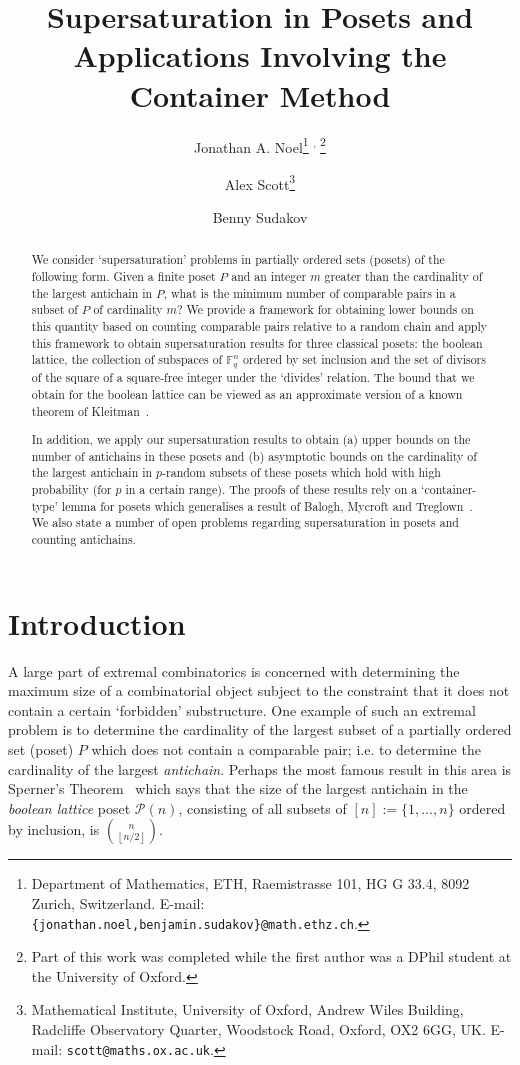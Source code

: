 \documentclass[11 pt]{article}
\title{Supersaturation in Posets and Applications Involving the Container Method}
\author{Jonathan A. Noel\thanks{Department of Mathematics, ETH, Raemistrasse 101, HG G 33.4, 8092 Zurich, Switzerland. E-mail: \texttt{\{jonathan.noel,benjamin.sudakov\}@math.ethz.ch}.} $^{\text{, }}$\thanks{Part of this work was completed while the first author was a DPhil student at the University of Oxford.}
\and Alex Scott\thanks{Mathematical Institute, University of Oxford, Andrew Wiles Building, Radcliffe Observatory Quarter, Woodstock Road, Oxford, OX2 6GG, UK. E-mail: \texttt{scott@maths.ox.ac.uk}.}
\and Benny Sudakov\footnotemark[1]
}
\date{}
\theoremstyle{definition}
\theoremstyle{case}
\numberwithin{equation}{section}
\begin{document}
\maketitle

\begin{abstract}
We consider `supersaturation' problems  in partially ordered sets (posets) of the following form. Given a finite poset $P$ and an integer $m$ greater than the cardinality of the largest antichain in $P$, what is the minimum number of comparable pairs in a subset of $P$ of cardinality $m$? We provide a framework for obtaining lower bounds on this quantity based on counting comparable pairs relative to a random chain and apply this framework to obtain supersaturation results for three classical posets: the boolean lattice, the collection of subspaces of $\mathbb{F}_q^n$ ordered by set inclusion and the set of divisors of the square of a square-free integer under the `divides' relation. The bound that we obtain for the boolean lattice can be viewed as an approximate version of a known theorem of Kleitman~\cite{superKleitman}.

In addition, we apply our supersaturation results to obtain (a) upper bounds on the number of antichains in these posets and (b) asymptotic bounds on the cardinality of the largest  antichain in $p$-random subsets of these posets which hold with high probability (for $p$ in a certain range). The proofs of these results rely on a  `container-type' lemma for posets which generalises a result of Balogh, Mycroft and Treglown~\cite{RandomSperner}. We also state a number of open problems regarding supersaturation in posets and counting antichains.
\end{abstract}

\section{Introduction}

A large part of extremal combinatorics is concerned with determining the maximum size of a combinatorial object subject to the constraint that it does not contain a certain `forbidden' substructure. One example of such an extremal problem is to determine the cardinality of the largest subset of a partially ordered set (poset) $P$ which does not contain a comparable pair; i.e. to determine the cardinality of the largest \emph{antichain}. Perhaps the most famous result in this area is Sperner's Theorem~\cite{Sperner} which says that the size of the largest antichain in the \emph{boolean lattice} poset $\mathcal{P}(n)$, consisting of all subsets of $[n]:=\{1,\dots,n\}$ ordered by inclusion, is $\binom{n}{\left\lfloor n/2\right\rfloor}$. 
\end{document}
